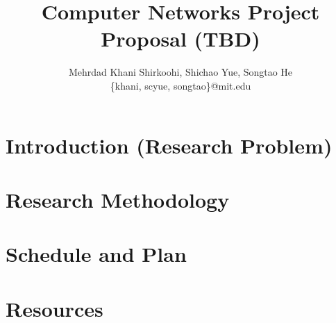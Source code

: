 \documentclass[letterpaper,10pt,onecolumn]{article}
\title{Computer Networks Project Proposal (TBD)}
\author{Mehrdad Khani Shirkoohi, Shichao Yue, Songtao He \\
\{khani, scyue, songtao\}@mit.edu
}
\begin{document}
\date{}
\maketitle
\section{Introduction (Research Problem)}
\section{Research Methodology}
\section{Schedule and Plan}
\section{Resources}
\end{document}
